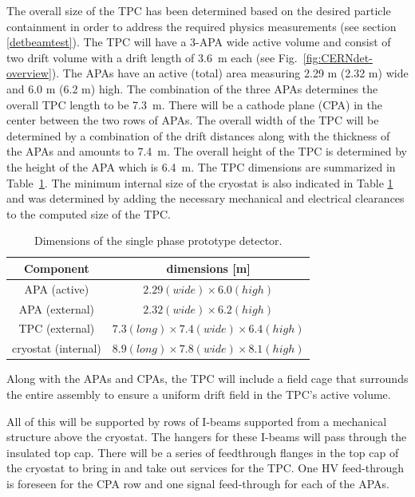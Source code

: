 The overall size of the TPC has been determined based on the desired particle containment in order to address the required physics measurements (see section \ref{detbeamtest}). The TPC will have a 3-APA wide active volume and consist of two drift volume with a drift length of 3.6~m each (see Fig.~\ref{fig:CERNdet-overview}).  
The APAs have an active (total) area measuring 2.29 m (2.32 m) wide and 6.0 m (6.2 m) high. The combination of the three APAs determines the overall TPC length to be 7.3~m. There will be a cathode plane (CPA) in the center between the two rows of APAs.  
The overall width of the TPC will be determined by a combination of the drift distances along with the thickness of the APAs
and amounts to 7.4~m.  
The overall height of the TPC is determined by the height of the APA which is 6.4~m.  The TPC dimensions are summarized in 
Table~\ref{table:TPC-dim}.
%
The minimum internal size of the cryostat is also indicated in Table \ref{table:TPC-dim} and was determined by adding the necessary mechanical and electrical clearances to the computed size of the TPC.  
 
\begin{table}[h]
\centering
\begin{tabular}{|c|c|}
\hline
\textbf{ Component } & dimensions [m]  \\ \hline \hline
APA  (active) &  $2.29 (wide) \times 6.0 (high)$ \\ \hline
APA  (external) &  $2.32 (wide) \times 6.2 (high)$ \\ \hline
TPC (external)       & $7.3 (long) \times 7.4 (wide) \times 6.4 (high)$  \\ \hline
cryostat (internal) &  $8.9 (long) \times 7.8 (wide) \times 8.1 (high)$  \\ \hline
\end{tabular}
\caption{Dimensions of the single phase prototype detector.}
\label{table:TPC-dim}
\end{table}
 
Along with the APAs and CPAs, the TPC will include a field cage that surrounds the entire assembly to ensure a uniform drift field in the TPC's active volume. 


All of this will be supported by rows of I-beams supported from a mechanical structure above the cryostat.  The hangers for these I-beams will pass through the insulated top cap.  There will be a series of feedthrough flanges in the top cap of the cryostat to bring in and take out services for the TPC.  One HV feed-through is foreseen for the CPA row and one signal feed-through for each of the APAs.

